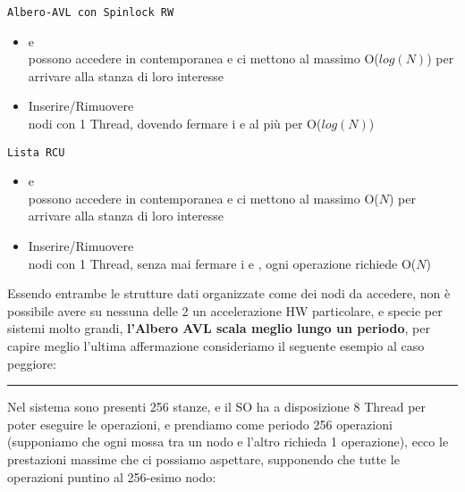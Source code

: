 \begin{minipage}{0.45\linewidth}
\begin{center}
\texttt{Albero-AVL con Spinlock RW}
\end{center}

\begin{itemize}
 \item[\faSmileO] \Writer e \Reader\\
possono accedere in contemporanea e ci mettono al {\color{red}massimo O($log(N)$)} per arrivare alla stanza di loro
interesse
\item[\faSmileO\faMehO] Inserire/Rimuovere\\
nodi con {\color{orange}1 Thread}, dovendo fermare i \Writer e \Reader al più per {\color{red}O($log(N)$)}

\end{itemize}
\end{minipage}
\hfill
\begin{minipage}{0.45\linewidth}
\begin{center}
\texttt{Lista RCU}
\end{center}

\begin{itemize}
 \item[\faFrownO] \Writer e \Reader\\
possono accedere in contemporanea e ci mettono al {\color{red}massimo O($N$)} per arrivare alla stanza di loro
interesse
 \item[\faMehO] Inserire/Rimuovere\\
nodi con {\color{orange}1 Thread}, senza mai fermare i \Writer e \Reader, ogni operazione richiede
{\color{red}O($N$)}
\end{itemize}
\end{minipage}

Essendo entrambe le strutture dati organizzate come dei nodi da accedere, non è possibile avere su nessuna delle 2 un
accelerazione HW particolare, e specie per sistemi molto grandi, \textbf{l'Albero AVL scala meglio lungo un periodo},
per capire meglio l'ultima affermazione consideriamo il seguente esempio al caso peggiore:

\rule{\linewidth}{0.5pt}
Nel sistema sono presenti {\color{orange}256 stanze}, e il SO ha a disposizione {\color{orange}8 Thread} per
poter eseguire le operazioni, e prendiamo come periodo {\color{orange}256 operazioni} (supponiamo che ogni
mossa tra un nodo e l'altro richieda 1 operazione), ecco le prestazioni massime che ci possiamo aspettare, supponendo
che tutte le operazioni puntino al 256-esimo nodo:

